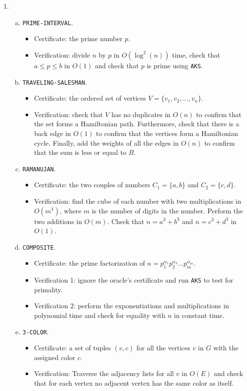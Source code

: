 \documentclass{article}
\begin{document}
\begin{enumerate}[1.]
    \item 
    \begin{enumerate}[(a)]
        \item \texttt{PRIME-INTERVAL}.
        \begin{itemize}
            \item Certificate: the prime number $p$.
            \item Verification: divide $n$ by $p$ in $O(\log^2(n))$ time, check that $a \leq p \leq b$ in $O(1)$ and check that $p$ is prime using \texttt{AKS}.
        \end{itemize}
        \item \texttt{TRAVELING-SALESMAN}.
        \begin{itemize}
            \item Certificate: the ordered set of vertices $V = \{v_1, v_2, \ldots , v_n\}$.
            \item Verification: check that $V$ has no duplicates in $O(n)$ to confirm that the set forms a Hamiltonian path. Furthermore, check that there is a back edge in $O(1)$ to confirm that the vertices form a Hamiltonian cycle. Finally, add the weights of all the edges in $O(n)$ to confirm that the sum is less or equal to $B$.
        \end{itemize}
        \item \texttt{RAMANUJAN}.
        \begin{itemize}
            \item Certificate: the two couples of numbers $C_1 = \{a, b\}$ and $C_2 = \{c, d\}$.
            \item Verification: find the cube of each number with two multiplications in $O(m^4)$, where $m$ is the number of digits in the number. Perform the two additions in $O(m)$. Check that $n = a^3 + b^3$ and $n = c^3 + d^3$ in $O(1)$.
        \end{itemize}
        \item \texttt{COMPOSITE}.
        \begin{itemize}
            \item Certificate: the prime factorization of $n = p_1^{\alpha_1}p_2^{\alpha_2} \ldots p_m^{\alpha_m}$.
            \item Verification 1: ignore the oracle's certificate and run \texttt{AKS} to test for primality.
            \item Verification 2: perform the exponentiations and multiplications in polynomial time and check for equality with $n$ in constant time.
        \end{itemize}
        \item \texttt{3-COLOR}.
        \begin{itemize}
            \item Certificate: a set of tuples $(v,c)$ for all the vertices $v$ in $G$ with the assigned color $c$.
            \item Verification: Traverse the adjacency lists for all $v$ in $O(E)$ and check that for each vertex no adjacent vertex has the same color as itself.
        \end{itemize}
    \end{enumerate}
    

\end{enumerate}
\end{document}
